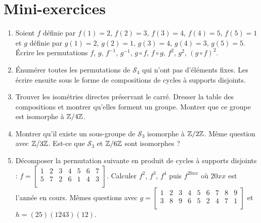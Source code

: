 \section*{Mini-exercices}


\begin{frame}

\begin{miniexercice}
{\small
\begin{enumerate}
  \item Soient $f$ définie par $f(1)=2$, $f(2)=3$, $f(3)=4$, $f(4)=5$, $f(5)=1$
et $g$ définie par $g(1)=2$, $g(2)=1$, $g(3)=4$, $g(4)=3$, $g(5)=5$. \'Ecrire les permutations
$f$, $g$, $f^{-1}$, $g^{-1}$, $g\circ f$, $f\circ g$, $f^2$, $g^2$, $(g\circ f)^2$.
  \item \'Enumérer toutes les permutations de $\mathcal{S}_4$ qui n'ont pas d'éléments fixes.
Les écrire ensuite sous le forme de compositions de cycles à supports disjoints.
  \item Trouver les isométries directes préservant le carré. Dresser la table des compositions
et montrer qu'elles forment un groupe. Montrer que ce groupe est isomorphe à $\mathbb{Z}/4\mathbb{Z}$.
  \item Montrer qu'il existe un sous-groupe de $\mathcal{S}_3$ isomorphe à $\mathbb{Z}/2\mathbb{Z}$.
Même question avec $\mathbb{Z}/3\mathbb{Z}$. Est-ce que $\mathcal{S}_3$ et $\mathbb{Z}/6\mathbb{Z}$ sont isomorphes ?
  \item Décomposer la permutation suivante en produit de cycles à supports disjoints :
$f=
\left[\begin{smallmatrix} 
 1 & 2 & 3 & 4 & 5 & 6 & 7 \\  
 5 & 7 & 2 & 6 & 1 & 4 & 3 \\      
\end{smallmatrix} \right]
$. 
Calculer $f^2$, $f^3$, $f^4$ puis $f^{20xx}$ où $20xx$ est l'année en cours. Mêmes questions avec 
$g=
\left[\begin{smallmatrix} 
 1 & 2 & 3 & 4 & 5 & 6 & 7 & 8 & 9 \\  
 3 & 8 & 9 & 6 & 5 & 2 & 4 & 7 & 1\\      
\end{smallmatrix} \right]$ et
$h = (2 5)(1 2 4 3)(1 2)$.
\end{enumerate}
}
\end{miniexercice}
\end{frame}



